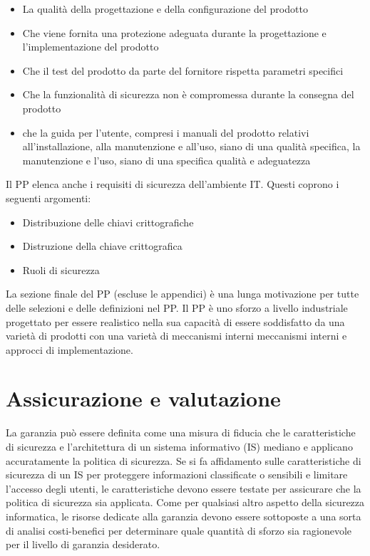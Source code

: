 \begin{itemize}
    \item La qualità della progettazione e della configurazione del prodotto
    
    \item Che viene fornita una protezione adeguata durante la progettazione e l'implementazione del prodotto
    
    \item  Che il test del prodotto da parte del fornitore rispetta parametri specifici
    
    \item Che la funzionalità di sicurezza non è compromessa durante la consegna del prodotto
    
    \item che la guida per l'utente, compresi i manuali del prodotto relativi all'installazione, alla manutenzione e all'uso, siano di una qualità specifica, la manutenzione e l'uso, siano di una specifica qualità e adeguatezza
\end{itemize}
Il PP elenca anche i requisiti di sicurezza dell'ambiente IT. Questi coprono i seguenti argomenti:
\begin{itemize}
    \item Distribuzione delle chiavi crittografiche
    
    \item Distruzione della chiave crittografica
    
    \item Ruoli di sicurezza
\end{itemize}
La sezione finale del PP (escluse le appendici) è una lunga motivazione per tutte delle selezioni e delle definizioni nel PP. Il PP è uno sforzo a livello industriale progettato per essere realistico nella sua capacità di essere soddisfatto da una varietà di prodotti con una varietà di meccanismi interni meccanismi interni e approcci di implementazione.
\newpage
\section{Assicurazione e valutazione}
La garanzia può essere definita come una misura di fiducia che le caratteristiche di sicurezza e l'architettura di un sistema informativo (IS) mediano e applicano accuratamente la politica di sicurezza. Se si fa affidamento sulle caratteristiche di sicurezza di un IS per proteggere informazioni classificate o sensibili e limitare l'accesso degli utenti, le caratteristiche devono essere testate per assicurare che la politica di sicurezza sia applicata. Come per qualsiasi altro aspetto della sicurezza informatica, le risorse dedicate alla garanzia devono essere sottoposte a una sorta di analisi costi-benefici per determinare quale quantità di sforzo sia ragionevole per il livello di garanzia desiderato.
